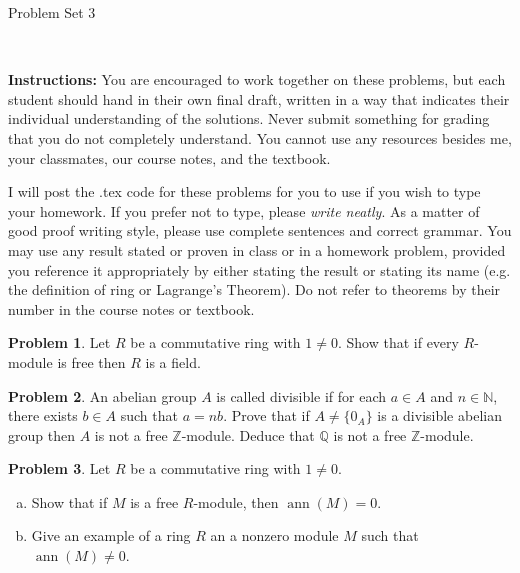 \documentclass[11pt]{article}
\title{}
\date{\vspace{-0.5in}}
\DeclareMathOperator{\ann}{ann}
\newcommand{\Q}{\mathbb{Q}}
\newcommand{\Z}{\mathbb{Z}}
\newcommand{\N}{\mathbb{N}}
\theoremstyle{definition}
\newtheorem{problem}{Problem}
\begin{document}
\thispagestyle{fancy}
\pagestyle{fancy}

\vspace{3em}

\begin{center}
	{\LARGE Problem Set 3}
\end{center}

\

\noindent
{\bf Instructions:}
You are encouraged to work together on these problems, but each student should hand in their own final draft, written in a way that indicates their individual understanding of the solutions. Never submit something for grading that you do not completely understand. You cannot use any resources besides me, your classmates, our course notes, and the textbook.


I will post the .tex code for these problems for you to use if you wish to type your homework. If you prefer not to type, please  {\em write neatly}. As a matter of good proof writing style, please use complete sentences and correct grammar. You may use any result  stated or proven in class or in a homework problem, provided you reference it appropriately by either stating the result or stating its name (e.g. the definition of ring or Lagrange's Theorem). Do not refer to theorems by their number in the course notes or textbook.


\vspace{2em}




\begin{problem}
	Let $R$ be a commutative ring with $1 \neq 0$. Show that if every $R$-module is free then $R$ is a field.
\end{problem}

\begin{problem}
An abelian group $A$ is called divisible if for each $a \in A$ and $n \in \N$, there exists $b \in A$ such that $a = nb$. Prove that if $A \neq\{0_A\}$ is a divisible abelian group then $A$ is not a free $\Z$-module. Deduce that $\Q$ is not a free $\Z$-module.
\end{problem}



\begin{problem}
	Let $R$ be a commutative ring with $1 \neq 0$.
	\begin{enumerate}[a)]
		\item Show that if $M$ is a free $R$-module, then $\ann(M) = 0$.
		\item Give an example of a ring $R$ an a nonzero module $M$ such that $\ann(M) \neq 0$.
	\end{enumerate}
\end{problem}
\end{document}
